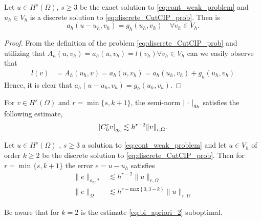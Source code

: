 \begin{lemma}
Let $u \in H^{s}( \Omega )  $, $ s\ge 3 $  be the exact solution to   \eqref{eq:cont_weak_problem} and $u_{h} \in V_{h}$ is a discrete solution to \eqref{eq:discrete_CutCIP_prob}. Then is \[
    a_{h}( u - u_{h}, v_{h}) = g_{h} ( u_{h}, v_{h}) \quad \forall v_{h} \in V_{h}.
    \]
\end{lemma}

\begin{proof}
   From the definition of the problem \eqref{eq:discrete_CutCIP_prob} and utilizing that $A_{h}( u,v_{h}) = a_{h}( u,v_{h}) = l(v_{h} ) \forall v_{h} \in V_{h} $ can we easily observe that \[
       \begin{split}
   l(v ) & =  A_{h}( u_{h},v) =  a_{h}( u,v_{h})  = a_{h}( u_{h},v_{h})+g_{h}( u_{h},v_{h})
       \end{split}
   \]
    Hence, it is clear that $a_{h}( u -  u_{h}, v_{h}) = g_{h}( u_{h},v_{h})  $.
\end{proof}

\begin{assumption}[EP2]
    \label{as:bi_EP2}
    For $v \in H^{s}( \Omega ) $ and $r = \min \{s,k+1 \} $, the semi-norm $\left\lvert  \ \cdot \   \right\rvert_{g_{h}} $ satisfies the following estimate, \[
    \left\lvert  C _{h}^{e} v  \right\rvert _{g_{h}} \lesssim  h^{r-2} \| v \|_{ r,\Omega  }^{  }.
    \]
\end{assumption}

\begin{theorem}
    \label{thm:apriori_result}
    Let $u \in H^{s}( \Omega ) $ , $s\ge 3$ a solution to \eqref{eq:cont_weak_problem} and let $u \in V_{h}$ of order $k\ge 2$ be the discrete solution to \eqref{eq:discrete_CutCIP_prob}. Then for $r = \min_{}\{s, k+1\} $ the error $e = u - u_{h}$ satisfies
    \begin{align}
        \label{eq:bi_apriori_1}
            \| e \|_{ a_{h},* }^{  } &\lesssim   h^{r-2} \| u \|_{ r,\Omega  }^{  }\\
        \label{eq:bi_apriori_2}
        \| e \|_{ \Omega  }^{  } &\lesssim   h^{r-\mathrm{max}\left\{ 0, 3-k \right\} } \| u \|_{ r,\Omega  }^{  }
    \end{align}

\end{theorem}
\begin{remark}
    Be aware that for $k=2$ is the estimate \eqref{eq:bi_apriori_2} suboptimal.
\end{remark}


